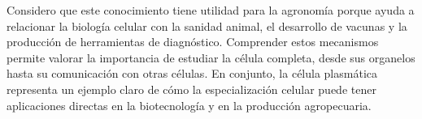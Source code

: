 Considero que este conocimiento tiene utilidad para la agronomía porque ayuda a relacionar la biología celular con la sanidad animal, el desarrollo de vacunas y la producción de herramientas de diagnóstico. Comprender estos mecanismos permite valorar la importancia de estudiar la célula completa, desde sus organelos hasta su comunicación con otras células. En conjunto, la célula plasmática representa un ejemplo claro de cómo la especialización celular puede tener aplicaciones directas en la biotecnología y en la producción agropecuaria.
